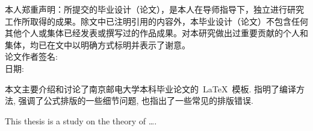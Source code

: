 {%

本人郑重声明：所提交的毕业设计（论文），是本人在导师指导下，独立进行研究工作所取得的成果。除文中已注明引用的内容外，本毕业设计（论文）不包含任何其他个人或集体已经发表或撰写过的作品成果。对本研究做出过重要贡献的个人和集体，均已在文中以明确方式标明并表示了谢意。\\



\hspace*{8cm}论文作者签名: \\
\hspace*{8cm}日期: }
\baselineskip=23pt  %




\begin{cnabstract}
\thispagestyle{empty}
本文主要介绍和讨论了南京邮电大学本科毕业论文的~\LaTeX~模板.
指明了编译方法, 强调了公式排版的一些细节问题, 也指出了一些常见的排版错误.



\end{cnabstract}
\par
\vspace*{2em}






\begin{enabstract}
\thispagestyle{empty}
This thesis is a study on the theory of \dots.

\end{enabstract}
\par
\vspace*{2em}

 \enkeywords{\LaTeX{};  }
